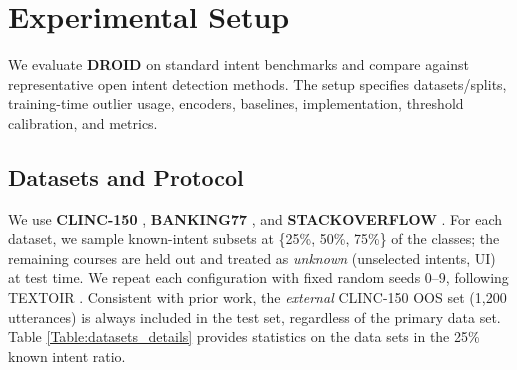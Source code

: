 \documentclass[journal,letterpaper]{IEEEtran}
\begin{document}




\section{Experimental Setup}
\label{sec:experimental_setup}
We evaluate \textbf{DROID} on standard intent benchmarks and compare against representative open intent detection methods. The setup specifies datasets/splits, training-time outlier usage, encoders, baselines, implementation, threshold calibration, and metrics.

\subsection{Datasets and Protocol}
We use \textbf{CLINC-150} \cite{Larson_2019}, \textbf{BANKING77} \cite{Casanueva_2020}, and \textbf{STACKOVERFLOW} \cite{Xu_2015}. For each dataset, we sample known-intent subsets at \{25\%, 50\%, 75\%\} of the classes; the remaining courses are held out and treated as \emph{unknown} (unselected intents, UI) at test time. We repeat each configuration with fixed random seeds $0$–$9$, following TEXTOIR \cite{zhang-etal-2021-textoir}. Consistent with prior work, the \emph{external} CLINC-150 OOS set (1{,}200 utterances) is always included in the test set, regardless of the primary data set. Table \ref{Table:datasets_details} provides statistics on the data sets in the 25\% known intent ratio.
\end{document}
